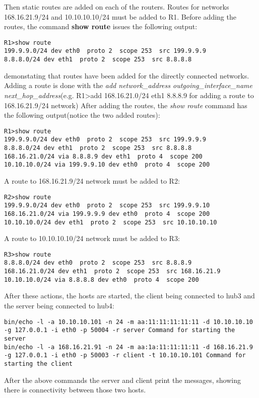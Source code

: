 {{Then static routes are added on each of the routers.
Routes for networks 168.16.21.9/24 and 10.10.10.10/24 must be added to R1.
Before adding the routes, the command \textbf{show route} issues the following output:
\lstset{language=TeX, caption=Directly connected routes}
\begin{lstlisting}
R1>show route  
199.9.9.0/24 dev eth0  proto 2  scope 253  src 199.9.9.9 
8.8.8.0/24 dev eth1  proto 2  scope 253  src 8.8.8.8 
\end{lstlisting}
demonstating that routes have been added for the directly connected networks.
Adding a route is done with the \textit{add network_address outgoing_interface_name next_hop_address}(e.g. R1>add 168.16.21.0/24 eth1 8.8.8.9 for adding a route to 168.16.21.9/24 network)
After adding the routes, the \textit{show route} command has the following output(notice the two added routes):
\lstset{language=TeX, caption=R1 routing table}
\begin{lstlisting}
R1>show route  
199.9.9.0/24 dev eth0  proto 2  scope 253  src 199.9.9.9 
8.8.8.0/24 dev eth1  proto 2  scope 253  src 8.8.8.8 
168.16.21.0/24 via 8.8.8.9 dev eth1  proto 4  scope 200
10.10.10.0/24 via 199.9.9.10 dev eth0  proto 4  scope 200
\end{lstlisting}

A route to 168.16.21.9/24 network must be added to R2:
\lstset{language=TeX, caption=R2 routing table}
\begin{lstlisting}
R2>show route  
199.9.9.0/24 dev eth0  proto 2  scope 253  src 199.9.9.10 
168.16.21.0/24 via 199.9.9.9 dev eth0  proto 4  scope 200 
10.10.10.0/24 dev eth1  proto 2  scope 253  src 10.10.10.10
\end{lstlisting}

A route to 10.10.10.10/24 network must be added to R3:
\lstset{language=TeX, caption=R3 routing table}
\begin{lstlisting}
R3>show route  
8.8.8.0/24 dev eth0  proto 2  scope 253  src 8.8.8.9 
168.16.21.0/24 dev eth1  proto 2  scope 253  src 168.16.21.9 
10.10.10.0/24 via 8.8.8.8 dev eth0  proto 4  scope 200
\end{lstlisting}

After these actions, the hosts are started, the client being connected to hub3 and the server being connected to hub4:
\lstset{language=TeX, caption=Commands issued for starting client and server}
\begin{lstlisting}
bin/echo -l -a 10.10.10.101 -n 24 -m aa:11:11:11:11:11 -d 10.10.10.10 -g 127.0.0.1 -i eth0 -p 50004 -r server Command for starting the server
bin/echo -l -a 168.16.21.91 -n 24 -m aa:1a:11:11:11:11 -d 168.16.21.9 -g 127.0.0.1 -i eth0 -p 50003 -r client -t 10.10.10.101 Command for starting the client
\end{lstlisting}
After the above commands the server and client print the messages, showing there is connectivity between those two hosts.
}}
